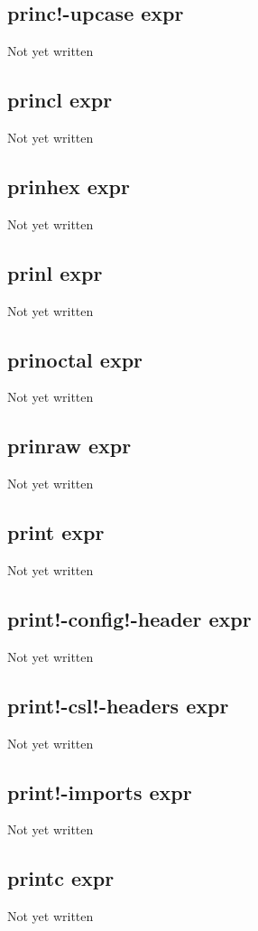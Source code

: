 \documentclass[a4paper,11pt]{article}
\begin{document}
\subsection{\ttfamily princ!-upcase expr}
Not yet written

\subsection{\ttfamily princl expr}
Not yet written

\subsection{\ttfamily prinhex expr}
Not yet written

\subsection{\ttfamily prinl expr}
Not yet written

\subsection{\ttfamily prinoctal expr}
Not yet written

\subsection{\ttfamily prinraw expr}
Not yet written

\subsection{\ttfamily print expr}
Not yet written

\subsection{\ttfamily print!-config!-header expr}
Not yet written

\subsection{\ttfamily print!-csl!-headers expr}
Not yet written

\subsection{\ttfamily print!-imports expr}
Not yet written

\subsection{\ttfamily printc expr}
Not yet written
\end{document}
